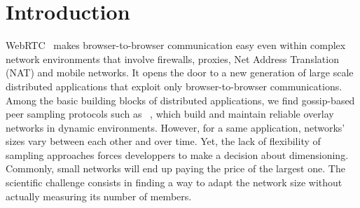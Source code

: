 
\section{Introduction}


WebRTC~\cite{webrtc} makes browser-to-browser communication easy even within
complex network environments that involve firewalls, proxies, Net Address
Translation (NAT) and mobile networks. It opens the door to a new generation of
large scale distributed applications that exploit only browser-to-browser
communications. Among the basic building blocks of distributed applications, we
find gossip-based peer sampling protocols such as
\CYCLON~\cite{voulgaris2005cyclon}, which build and maintain reliable overlay
networks in dynamic environments. However, for a same application, networks'
sizes vary between each other and over time. Yet, the lack of flexibility of
sampling approaches forces developpers to make a decision about
dimensioning. Commonly, small networks will end up paying the price of the
largest one.
The scientific challenge consists in finding a way to adapt the network size
without actually measuring its number of members.


